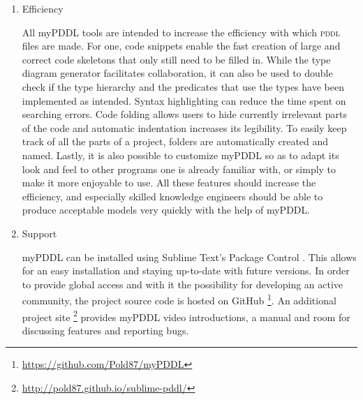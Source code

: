 \documentclass[a4paper,12pt]{report}
\newcommand{\mypddl}{\smallerft[0.8]{myPDDL}\xspace}
\newcommand{\pddl}{\textsc{pddl}\xspace}
\newcommand\smallerft[2][0.85]{{\scalefont{#1}#2}}
\begin{document}
\begin{enumerate}
The possibility to maintain \pddl files is a key aspect of \mypddl.
The automatically generated type diagram (\mypddl-dia) gives an
overview of the domain structure, and thereby serves as a continuous
means of documentation. In addition, the diagram supports the
understanding of existing or extended domains provided by other
knowledge engineers. Helping to understand foreign code, though, it
follows logically that \mypddl-dia also helps in coming back and
changing one’s own models if some time has elapsed since they were
last edited. The basic revision control feature of \mypddl-dia keeps
track of changes, making it easy to revert to a previous domain
version. Furthermore, \mypddl-new encourages adhering to an organized
project structure and stores corresponding files at the same location.
Text-based modeling facilitates using a common revision control system
like Git \cite{gronniger2007textbased}. The automatically created
readme file can induce the user to provide further information and
documentation about the \pddl project. When using a web-based hosting
service, the readme file is usually prominently displayed on the home
page of the project.

\item Efficiency
\label{sec-5-3-0-6}

All \mypddl tools are intended to increase the efficiency with which
\pddl files are made. For one, code snippets enable the fast creation
of large and correct code skeletons that only still need to be filled
in. While the type diagram generator facilitates collaboration, it can
also be used to double check if the type hierarchy and the predicates
that use the types have been implemented as intended. Syntax
highlighting can reduce the time spent on searching errors. Code
folding allows users to hide currently irrelevant parts of the code
and automatic indentation increases its legibility. To easily keep
track of all the parts of a project, folders are automatically created
and named. Lastly, it is also possible to customize \mypddl so as to
adapt its look and feel to other programs one is already familiar
with, or simply to make it more enjoyable to use. All these features
should increase the efficiency, and especially skilled knowledge
engineers should be able to produce acceptable models very quickly
with the help of \mypddl.
\item Support
\label{sec-5-3-0-7}

\mypddl can be installed using Sublime Text's Package Control
\cite{stpackage}. This allows for an easy installation and staying
up-to-date with future versions. In order to provide global access and
with it the possibility for developing an active community, the
project source code is hosted on GitHub \footnote{\url{https://github.com/Pold87/myPDDL}}. An additional project
site \footnote{\url{http://pold87.github.io/sublime-pddl/}} provides \mypddl video introductions, a manual and room
for discussing features and reporting bugs.



\end{enumerate}
\end{document}
